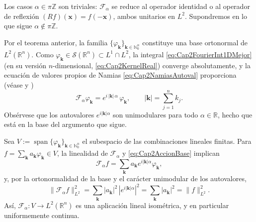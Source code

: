             \begin{Proof}
                Los casos $\alpha \in \pi\mathbb{Z}$ son triviales: $\mathcal{F}_\alpha$ se reduce al operador identidad o al operador de reflexión $(Rf)(\mathbf{x}) = f(-\mathbf{x})$, ambos unitarios en $L^2$. Supondremos en lo que sigue $\alpha \notin \pi\mathbb{Z}$.

                Por el teorema anterior, la familia $\{\varphi_{\boldsymbol{k}}\}_{\boldsymbol{k}\in \mathbb{N}_0^n}$ constituye una base ortonormal de $L^2(\mathbb{R}^n)$. Como $\varphi_{\boldsymbol{k}} \in \mathcal{S}(\mathbb{R}^n)\subset L^1\cap L^2$, la integral \eqref{eq:Cap2FourierInt1DMejor} (en su versión $n$-dimensional, \eqref{eq:Cap2KernelReal}) converge absolutamente, y la ecuación de valores propios de Namias \eqref{eq:Cap2NamiasAutoval} proporciona (véase \citep[\S2]{mcbride1987namias} y \citep[\S4.1]{ozaktas2001fractional})
                \begin{equation}\label{eq:Cap2AccionBase}
                    \mathcal{F}_\alpha \varphi_{\boldsymbol{k}} = e^{i\,|\boldsymbol{k}|\,\alpha}\,\varphi_{\boldsymbol{k}}, \qquad |\boldsymbol{k}|=\sum_{j=1}^n k_j.
                \end{equation}
                Obsérvese que los autovalores $e^{i|\boldsymbol{k}|\alpha}$ son unimodulares para todo $\alpha\in\mathbb{R}$, hecho que está en la base del argumento que sigue.

                Sea $V := \operatorname{span}\{\varphi_{\boldsymbol{k}}\}_{\boldsymbol{k}\in \mathbb{N}_0^n}$ el subespacio de las combinaciones lineales finitas. Para $f = \sum_{\boldsymbol{k}}a_{\boldsymbol{k}}\varphi_{\boldsymbol{k}} \in V$, la linealidad de $\mathcal{F}_\alpha$ y \eqref{eq:Cap2AccionBase} implican
                \begin{equation*}
                    \mathcal{F}_\alpha f = \sum_{\boldsymbol{k}} a_{\boldsymbol{k}} e^{i|\boldsymbol{k}|\alpha}\varphi_{\boldsymbol{k}},
                \end{equation*}
                y, por la ortonormalidad de la base y el carácter unimodular de los autovalores,
                \begin{equation*}
                    \|\mathcal{F}_\alpha f\|_{L^2}^2 = \sum_{\boldsymbol{k}}|a_{\boldsymbol{k}}|^2\,|e^{i|\boldsymbol{k}|\alpha}|^2 = \sum_{\boldsymbol{k}}|a_{\boldsymbol{k}}|^2 = \|f\|_{L^2}^2.
                \end{equation*}
                Así, $\mathcal{F}_\alpha : V \to L^2(\mathbb{R}^n)$ es una aplicación lineal isométrica, y en particular uniformemente continua.


\end{Proof}
